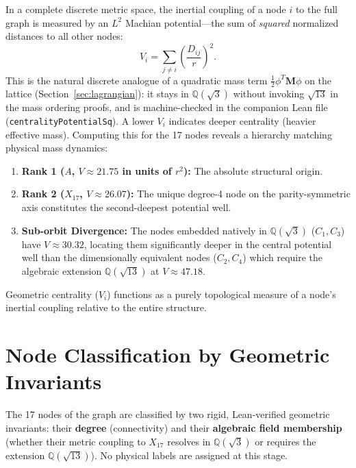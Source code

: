 \documentclass[12pt, a4paper]{article}
\begin{document}
In a complete discrete metric space, the inertial coupling of a node $i$ to the full graph is measured by an $L^2$ Machian potential---the sum of \emph{squared} normalized distances to all other nodes:
\[
V_i = \sum_{j \neq i} \left(\frac{D_{ij}}{r}\right)^2 .
\]
This is the natural discrete analogue of a quadratic mass term $\frac{1}{2}\phi^T \mathbf{M}\phi$ on the lattice (Section~\ref{sec:lagrangian}): it stays in $\mathbb{Q}(\sqrt{3})$ without invoking $\sqrt{13}$ in the mass ordering proofs, and is machine-checked in the companion Lean file (\texttt{centralityPotentialSq}). A lower $V_i$ indicates deeper centrality (heavier effective mass). Computing this for the 17 nodes reveals a hierarchy matching physical mass dynamics:
\begin{enumerate}[nosep]
    \item \textbf{Rank 1 ($A$, $V \approx 21.75$ in units of $r^2$):} The absolute structural origin.
    \item \textbf{Rank 2 ($X_{17}$, $V \approx 26.07$):} The unique degree-4 node on the parity-symmetric axis constitutes the second-deepest potential well.
    \item \textbf{Sub-orbit Divergence:} The nodes embedded natively in $\mathbb{Q}(\sqrt{3})$ ($C_1, C_3$) have $V \approx 30.32$, locating them significantly deeper in the central potential well than the dimensionally equivalent nodes ($C_2, C_4$) which require the algebraic extension $\mathbb{Q}(\sqrt{13})$ at $V \approx 47.18$.
\end{enumerate}

Geometric centrality ($V_i$) functions as a purely topological measure of a node's inertial coupling relative to the entire structure.

\section{Node Classification by Geometric Invariants}

The 17 nodes of the graph are classified by two rigid, Lean-verified geometric invariants: their \textbf{degree} (connectivity) and their \textbf{algebraic field membership} (whether their metric coupling to $X_{17}$ resolves in $\mathbb{Q}(\sqrt{3})$ or requires the extension $\mathbb{Q}(\sqrt{13})$). No physical labels are assigned at this stage.
\end{document}
